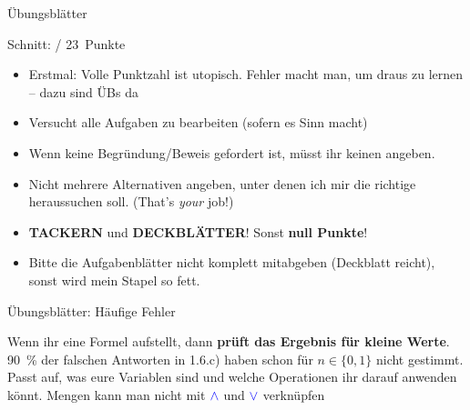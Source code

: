 

\newcommand{\handout}{}




\graphicspath{{../figures/}}



\begin{frame}{Übungsblätter}
	
	Schnitt:  / 23~Punkte
	
	\begin{itemize}
		\item Erstmal: Volle Punktzahl ist utopisch. Fehler macht man, um draus zu lernen – dazu sind ÜBs da
		\item Versucht alle Aufgaben zu bearbeiten (sofern es Sinn macht)
		\item Wenn keine Begründung/Beweis gefordert ist, müsst ihr keinen angeben.
		\item Nicht mehrere Alternativen angeben, unter denen ich mir die richtige heraussuchen soll. (That's \emph{your} job!)
		\item \textbf{TACKERN} und \textbf{DECKBLÄTTER}! Sonst \alert{\textbf{null Punkte}}!
		\item Bitte die Aufgabenblätter nicht komplett mitabgeben (Deckblatt reicht), sonst wird mein Stapel so fett. \smiley
	\end{itemize}
	
\end{frame}

\begin{frame}[t]{Übungsblätter: Häufige Fehler}
	
	
	\medskip

	\pause[9]
	Wenn ihr eine Formel aufstellt, dann \textbf{prüft das Ergebnis für kleine Werte}.\\[0.2em]
	90~\% der falschen Antworten in 1.6.c) haben schon für $n \in \{0, 1\}$ nicht gestimmt.\\[0.5em]
	
	\pause[10]
	Passt auf, was eure Variablen sind und welche Operationen ihr darauf anwenden könnt. Mengen kann man nicht mit $\mathbin{\textcolor{blue}{\wedge}}$ und $\mathbin{\textcolor{blue}{\vee}}$ verknüpfen
\end{frame}

